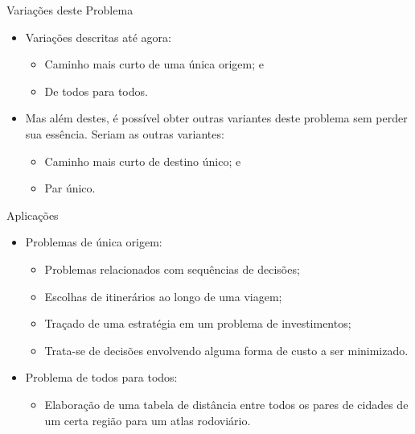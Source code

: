 \documentclass[aspectratio=169]{beamer}
\begin{document}
\begin{frame}{Variações deste Problema}
	\begin{itemize}
		\item Variações descritas até agora: 
		\begin{itemize}
			\item Caminho mais curto de uma única origem; e
			\item De todos para todos.
		\end{itemize}
	
		
		\item Mas além destes, é possível obter outras variantes deste problema sem perder sua essência. Seriam as outras variantes: 
		\begin{itemize}
			\item Caminho mais curto de destino único; e 
			\item Par único.
		\end{itemize}
	\end{itemize}
\end{frame}

\begin{frame}{Aplicações}
	\begin{itemize}
		\item Problemas de única origem:
		\begin{itemize}
			\item Problemas relacionados com sequências de decisões;
			\item Escolhas de itinerários ao longo de uma viagem;
			\item Traçado de uma estratégia em um problema de investimentos;
			\item Trata-se de decisões envolvendo alguma forma de custo a ser minimizado.
		\end{itemize}
		
		\bigskip
		
		\item Problema de todos para todos:
		\begin{itemize}
			\item Elaboração de uma tabela de distância entre todos os pares de cidades de um certa região para um atlas rodoviário.
		\end{itemize}
	\end{itemize}
\end{frame}
\end{document}
